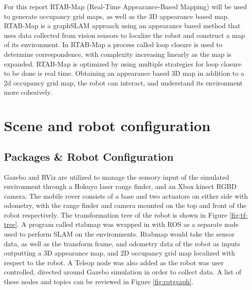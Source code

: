 \documentclass[10pt,journal,compsoc]{IEEEtran}
\begin{document}
For this report RTAB-Map (Real-Time Appearance-Based Mapping) will be used to generate occupancy grid maps, as well as the 3D appearance based map. RTAB-Map is  a graphSLAM approach using an appearance based method that uses data collected from vision sensors to localize the robot and construct a map of its environment. In RTAB-Map a process called loop closure is used to determine correspondence, with complexity increasing linearly as the map is expanded. RTAB-Map is optimized by using multiple strategies for loop closure to be done is real time. Obtaining an appearance based 3D map in addition to a 2d occupancy grid map, the robot can interact, and understand its environment more cohesively.

\section{Scene and robot configuration}
\label{sec:scene}

\subsection{Packages \& Robot Configuration}

Gazebo and RViz are utilized to manage the sensory input of the simulated environment through a Hokuyo laser range finder, and an Xbox kinect RGBD camera. The mobile rover consists of a base and two actuators on either side with odometry, with the range finder and camera mounted on the top and front of the robot respectively. The transformation tree of the robot is shown in Figure \ref{fig:tf-tree}. A program called rtabmap was wrapped in with ROS as a separate node used to perform SLAM on the environments. Rtabmap would take the sensor data, as well as the transform frame, and odometry data of the robot as inputs outputting a 3D appearance map, and 2D occupancy grid map localized with respect to the robot. A Teleop node was also added as the robot was user controlled, directed around Gazebo simulation in order to collect data. A list of these nodes and topics can be reviewed in Figure \ref{fig:rqtgraph}.
\end{document}
